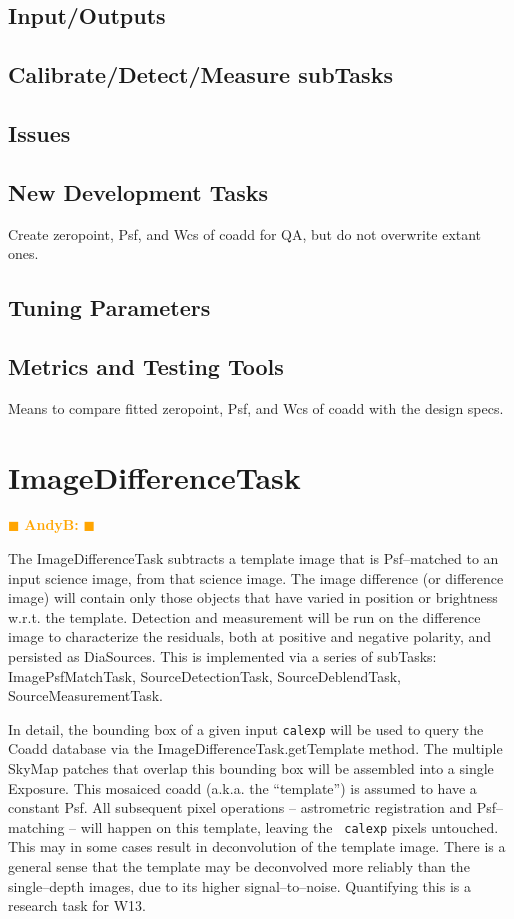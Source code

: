 \documentclass[12pt]{article}
\newcommand{\becker} { \textcolor{orange} {
\ensuremath{\blacksquare} {\bf AndyB:}  
\ensuremath{\blacksquare} } }
\begin{document}
\subsection{Input/Outputs}

\subsection{Calibrate/Detect/Measure subTasks}

\subsection{Issues}

\subsection{New Development Tasks}
Create zeropoint, Psf, and Wcs of coadd for QA, but do not overwrite
extant ones.

\subsection{Tuning Parameters}

\subsection{Metrics and Testing Tools}

Means to compare fitted zeropoint, Psf, and Wcs of coadd with the
design specs.


\clearpage 
\section{ImageDifferenceTask \label{sec-imagedifftask}} \becker

The ImageDifferenceTask subtracts a template image that is
Psf--matched to an input science image, from that science image.  The
image difference (or difference image) will contain only those objects
that have varied in position or brightness w.r.t. the template.
Detection and measurement will be run on the difference image to
characterize the residuals, both at positive and negative polarity,
and persisted as DiaSources.  This is implemented via a series of
subTasks: ImagePsfMatchTask, SourceDetectionTask, SourceDeblendTask,
SourceMeasurementTask.

In detail, the bounding box of a given input {\tt calexp} will be used
to query the Coadd database via the ImageDifferenceTask.getTemplate
method.  The multiple SkyMap patches that overlap this bounding box
will be assembled into a single Exposure.  This mosaiced coadd
(a.k.a. the ``template'') is assumed to have a constant Psf.  All
subsequent pixel operations -- astrometric registration and
Psf--matching -- will happen on this template, leaving the {\tt
  calexp} pixels untouched.  This may in some cases result in
deconvolution of the template image.  There is a general sense that
the template may be deconvolved more reliably than the single--depth
images, due to its higher signal--to--noise.  Quantifying this is a
research task for W13.
\end{document}
